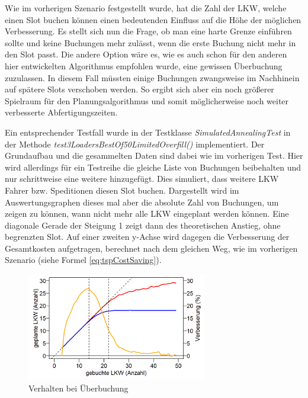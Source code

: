 Wie im vorherigen Szenario festgestellt wurde, hat die Zahl der LKW, welche einen Slot buchen können einen bedeutenden Einfluss auf die Höhe der möglichen Verbesserung. Es stellt sich nun die Frage, ob man eine harte Grenze einführen sollte und keine Buchungen mehr zulässt, wenn die erste Buchung nicht mehr in den Slot passt. Die andere Option wäre es, wie es auch schon für den anderen hier entwickelten Algorithmus empfohlen wurde, eine gewissen Überbuchung zuzulassen. In diesem Fall müssten einige Buchungen zwangsweise im Nachhinein auf spätere Slots verschoben werden. So ergibt sich aber ein noch größerer Spielraum für den Planungsalgorithmus und somit möglicherweise noch weiter verbesserte Abfertigungszeiten. 

Ein entsprechender Testfall wurde in der Testklasse \textit{SimulatedAnnealingTest} in der Methode \textit{test3LoadersBestOf50LimitedOverfill()} implementiert. Der Grundaufbau und die gesammelten Daten sind dabei wie im vorherigen Test. Hier wird allerdings für ein Testreihe die gleiche Liste von Buchungen beibehalten und nur schrittweise eine weitere hinzugefügt. Dies simuliert, dass weitere LKW Fahrer bzw. Speditionen diesen Slot buchen. Dargestellt wird im Auswertungsgraphen dieses mal aber die absolute Zahl von Buchungen, um zeigen zu können, wann nicht mehr alle LKW eingeplant werden können. Eine diagonale Gerade der Steigung 1 zeigt dann des theoretischen Anstieg, ohne begrenzten Slot. Auf einer zweiten y-Achse wird dagegen die Verbesserung der Gesamtkosten aufgetragen, berechnet nach dem gleichen Weg, wie im vorherigen Szenario (siehe Formel \ref{eq:tspCostSaving}).

\begin{figure}[H]
    \centering
    \includegraphics[width=0.7\textwidth]{images/graphs/tspSimALimOverfill.png}
    \caption{Verhalten bei Überbuchung}
    \label{fig:tspEvalOverfill}
\end{figure}

